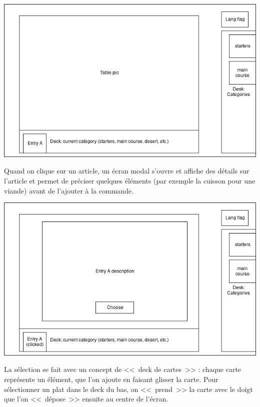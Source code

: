 \documentclass[a4paper,12pt]{article}
\begin{document}
\begin{center}
	\includegraphics[width=\textwidth]{in_place_screen1.jpg}
\end{center}

Quand on clique sur un article, un écran modal s'ouvre et affiche des détails sur l'article et permet de préciser
quelques éléments (par exemple la cuisson pour une viande) avant de l'ajouter à la commande.

\begin{center}
	\includegraphics[width=\textwidth]{in_place_screen2.jpg}
\end{center}

La sélection se fait avec un concept de <<~deck de cartes~>> : chaque carte représente un élément, que l'on ajoute
en faisant glisser la carte. Pour sélectionner un plat dans le deck du bas, on <<~prend~>> la carte avec le doigt que
l'on <<~dépose~>> ensuite au centre de l'écran.
\end{document}
